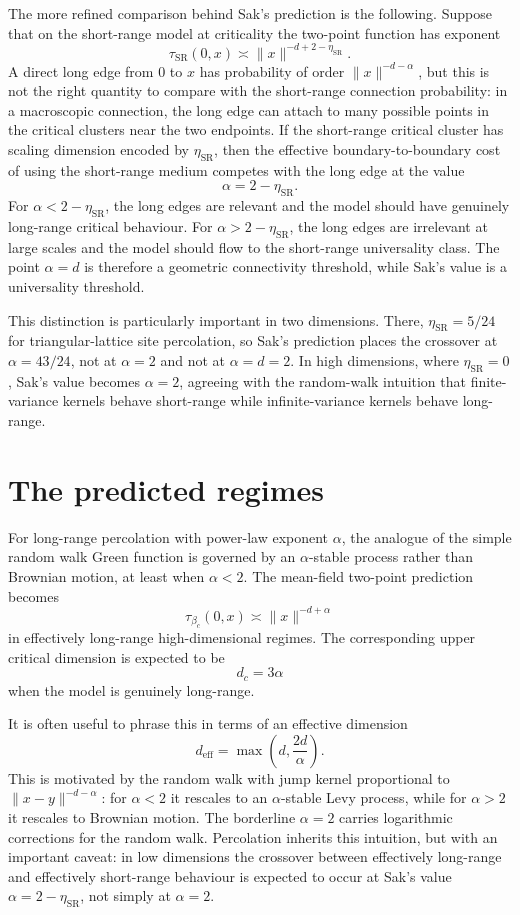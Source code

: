 \documentclass[11pt,reqno]{book}
\numberwithin{equation}{chapter}
\theoremstyle{plain}
\theoremstyle{definition}
\theoremstyle{remark}
\newcommand{\1}{\mathbf 1}
\newcommand{\norm}[1]{\lVert #1\rVert}
\newcommand{\as}{\asymp}
\begin{document}
The more refined comparison behind Sak's prediction is the following. Suppose that on the short-range model at criticality the two-point function has exponent
\[
  \tau_{\mathrm{SR}}(0,x)\as \norm{x}^{-d+2-\eta_{\mathrm{SR}}}.
\]
A direct long edge from $0$ to $x$ has probability of order $\norm{x}^{-d-\alpha}$, but this is not the right quantity to compare with the short-range connection probability: in a macroscopic connection, the long edge can attach to many possible points in the critical clusters near the two endpoints. If the short-range critical cluster has scaling dimension encoded by $\eta_{\mathrm{SR}}$, then the effective boundary-to-boundary cost of using the short-range medium competes with the long edge at the value
\[
  \alpha=2-\eta_{\mathrm{SR}}.
\]
For $\alpha<2-\eta_{\mathrm{SR}}$, the long edges are relevant and the model should have genuinely long-range critical behaviour. For $\alpha>2-\eta_{\mathrm{SR}}$, the long edges are irrelevant at large scales and the model should flow to the short-range universality class. The point $\alpha=d$ is therefore a geometric connectivity threshold, while Sak's value is a universality threshold.

This distinction is particularly important in two dimensions. There, $\eta_{\mathrm{SR}}=5/24$ for triangular-lattice site percolation, so Sak's prediction places the crossover at $\alpha=43/24$, not at $\alpha=2$ and not at $\alpha=d=2$. In high dimensions, where $\eta_{\mathrm{SR}}=0$, Sak's value becomes $\alpha=2$, agreeing with the random-walk intuition that finite-variance kernels behave short-range while infinite-variance kernels behave long-range.

\section{The predicted regimes}

For long-range percolation with power-law exponent $\alpha$, the analogue of the simple random walk Green function is governed by an $\alpha$-stable process rather than Brownian motion, at least when $\alpha<2$. The mean-field two-point prediction becomes
\[
  \tau_{\beta_c}(0,x)\as \norm{x}^{-d+\alpha}
\]
in effectively long-range high-dimensional regimes. The corresponding upper critical dimension is expected to be
\[
  d_c=3\alpha
\]
when the model is genuinely long-range.

It is often useful to phrase this in terms of an effective dimension
\[
  d_{\mathrm{eff}}=\max\left(d,\frac{2d}{\alpha}\right).
\]
This is motivated by the random walk with jump kernel proportional to $\norm{x-y}^{-d-\alpha}$: for $\alpha<2$ it rescales to an $\alpha$-stable Levy process, while for $\alpha>2$ it rescales to Brownian motion. The borderline $\alpha=2$ carries logarithmic corrections for the random walk. Percolation inherits this intuition, but with an important caveat: in low dimensions the crossover between effectively long-range and effectively short-range behaviour is expected to occur at Sak's value $\alpha=2-\eta_{\mathrm{SR}}$, not simply at $\alpha=2$.
\end{document}
